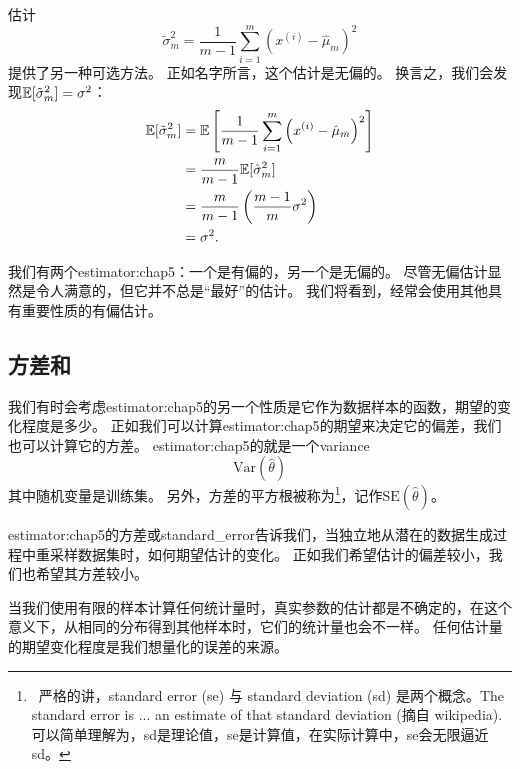 估计
\begin{equation}
    \tilde{\sigma}_m^2 = \frac{1}{m-1} \sum_{i=1}^m \left( x^{(i)} - \hat{\mu}_m \right)^2
\end{equation}
提供了另一种可选方法。
正如名字所言，这个估计是无偏的。
换言之，我们会发现$\mathbb{E}[\tilde{\sigma}_m^2] = \sigma^2$：
\begin{align}
    \mathbb{E}[\tilde{\sigma}_m^2] &= \mathbb{E} \left[ \frac{1}{m-1} \sum_{i=1}^m \left( x^{(i)} - \hat{\mu}_m \right)^2 \right] \\
        &= \frac{m}{m-1} \mathbb{E}[ \hat{\sigma}_m^2 ]  \\
        &= \frac{m}{m-1} \left( \frac{m-1}{m} \sigma^2 \right) \\
        &= \sigma^2.
\end{align}


我们有两个\gls{estimator:chap5}：一个是有偏的，另一个是无偏的。
尽管无偏估计显然是令人满意的，但它并不总是``最好''的估计。
我们将看到，经常会使用其他具有重要性质的有偏估计。

\subsection{方差和}
\label{sec:variance_and_standard_error}
我们有时会考虑\gls{estimator:chap5}的另一个性质是它作为数据样本的函数，期望的变化程度是多少。
正如我们可以计算\gls{estimator:chap5}的期望来决定它的偏差，我们也可以计算它的方差。
\gls{estimator:chap5}的就是一个\gls{variance}
\begin{equation}
    \text{Var}(\hat{\theta})
\end{equation}
其中随机变量是训练集。
另外，方差的平方根被称为\footnote{~严格的讲，standard error (se) 与 standard deviation (sd) 是两个概念。The standard error is ... an estimate of that standard deviation (摘自 wikipedia). 可以简单理解为，sd是理论值，se是计算值，在实际计算中，se会无限逼近sd。}，记作$\text{SE}(\hat{\theta})$。

\gls{estimator:chap5}的方差或\gls{standard_error}告诉我们，当独立地从潜在的数据生成过程中重采样数据集时，如何期望估计的变化。
正如我们希望估计的偏差较小，我们也希望其方差较小。

当我们使用有限的样本计算任何统计量时，真实参数的估计都是不确定的，在这个意义下，从相同的分布得到其他样本时，它们的统计量也会不一样。
任何估计量的期望变化程度是我们想量化的误差的来源。

